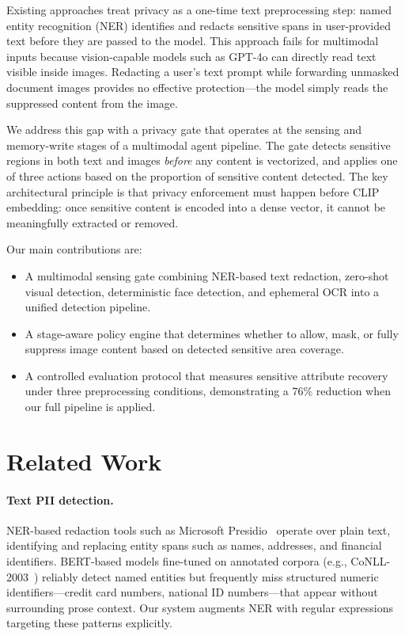\documentclass[11pt]{article}
\begin{document}
Existing approaches treat privacy as a one-time text preprocessing step: named entity recognition (NER) identifies and redacts sensitive spans in user-provided text before they are passed to the model. This approach fails for multimodal inputs because vision-capable models such as GPT-4o can directly read text visible inside images. Redacting a user's text prompt while forwarding unmasked document images provides no effective protection---the model simply reads the suppressed content from the image.

We address this gap with a privacy gate that operates at the sensing and memory-write stages of a multimodal agent pipeline. The gate detects sensitive regions in both text and images \textit{before} any content is vectorized, and applies one of three actions based on the proportion of sensitive content detected. The key architectural principle is that privacy enforcement must happen before CLIP embedding: once sensitive content is encoded into a dense vector, it cannot be meaningfully extracted or removed.

Our main contributions are:
\begin{itemize}[noitemsep]
    \item A multimodal sensing gate combining NER-based text redaction, zero-shot visual detection, deterministic face detection, and ephemeral OCR into a unified detection pipeline.
    \item A stage-aware policy engine that determines whether to allow, mask, or fully suppress image content based on detected sensitive area coverage.
    \item A controlled evaluation protocol that measures sensitive attribute recovery under three preprocessing conditions, demonstrating a 76\% reduction when our full pipeline is applied.
\end{itemize}

\section{Related Work}

\paragraph{Text PII detection.}
NER-based redaction tools such as Microsoft Presidio~\cite{presidio} operate over plain text, identifying and replacing entity spans such as names, addresses, and financial identifiers. BERT-based models fine-tuned on annotated corpora (e.g., CoNLL-2003~\cite{tjong2003}) reliably detect named entities but frequently miss structured numeric identifiers---credit card numbers, national ID numbers---that appear without surrounding prose context. Our system augments NER with regular expressions targeting these patterns explicitly.
\end{document}
